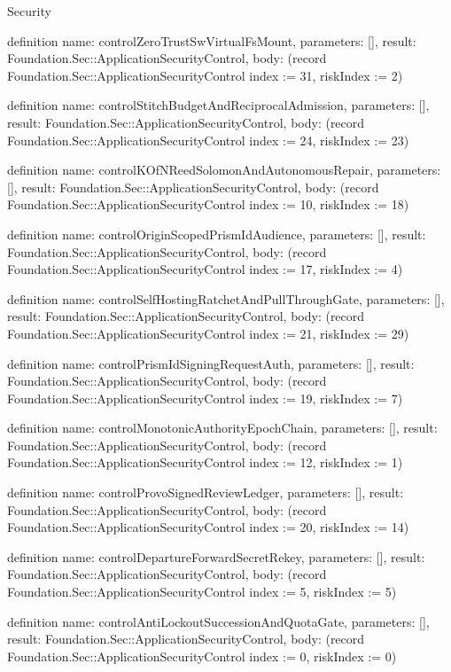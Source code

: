 \begin{lexlean}{Security}
\begin{semanticmodule}
definition{
  name: controlZeroTrustSwVirtualFsMount,
  parameters: [],
  result: Foundation.Sec::ApplicationSecurityControl,
  body: (record Foundation.Sec::ApplicationSecurityControl {index := 31, riskIndex := 2})
}

definition{
  name: controlStitchBudgetAndReciprocalAdmission,
  parameters: [],
  result: Foundation.Sec::ApplicationSecurityControl,
  body: (record Foundation.Sec::ApplicationSecurityControl {index := 24, riskIndex := 23})
}

definition{
  name: controlKOfNReedSolomonAndAutonomousRepair,
  parameters: [],
  result: Foundation.Sec::ApplicationSecurityControl,
  body: (record Foundation.Sec::ApplicationSecurityControl {index := 10, riskIndex := 18})
}

definition{
  name: controlOriginScopedPrismIdAudience,
  parameters: [],
  result: Foundation.Sec::ApplicationSecurityControl,
  body: (record Foundation.Sec::ApplicationSecurityControl {index := 17, riskIndex := 4})
}

definition{
  name: controlSelfHostingRatchetAndPullThroughGate,
  parameters: [],
  result: Foundation.Sec::ApplicationSecurityControl,
  body: (record Foundation.Sec::ApplicationSecurityControl {index := 21, riskIndex := 29})
}

definition{
  name: controlPrismIdSigningRequestAuth,
  parameters: [],
  result: Foundation.Sec::ApplicationSecurityControl,
  body: (record Foundation.Sec::ApplicationSecurityControl {index := 19, riskIndex := 7})
}

definition{
  name: controlMonotonicAuthorityEpochChain,
  parameters: [],
  result: Foundation.Sec::ApplicationSecurityControl,
  body: (record Foundation.Sec::ApplicationSecurityControl {index := 12, riskIndex := 1})
}

definition{
  name: controlProvoSignedReviewLedger,
  parameters: [],
  result: Foundation.Sec::ApplicationSecurityControl,
  body: (record Foundation.Sec::ApplicationSecurityControl {index := 20, riskIndex := 14})
}

definition{
  name: controlDepartureForwardSecretRekey,
  parameters: [],
  result: Foundation.Sec::ApplicationSecurityControl,
  body: (record Foundation.Sec::ApplicationSecurityControl {index := 5, riskIndex := 5})
}

definition{
  name: controlAntiLockoutSuccessionAndQuotaGate,
  parameters: [],
  result: Foundation.Sec::ApplicationSecurityControl,
  body: (record Foundation.Sec::ApplicationSecurityControl {index := 0, riskIndex := 0})
}


\end{semanticmodule}
\end{lexlean}

